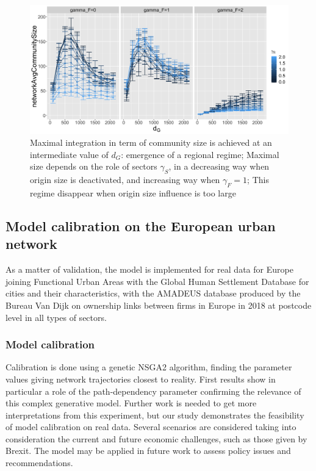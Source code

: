 \documentclass[11pt]{article}
\begin{document}
\begin{figure}
    \includegraphics[width=\textwidth]{figures/networkAvgCommunitySize_countryGravityDecay2100_gammaDestination0_facetwrapgammaOrigin_colorgammaSectors.png}
	\caption{Maximal integration in term of community size is achieved at an intermediate value of $d_G$: emergence of a regional regime; Maximal size depends on the role of sectors $\gamma_S$, in a decreasing way when origin size is deactivated, and increasing way when $\gamma_F=1$; This regime disappear when origin size influence is too large}
\end{figure}






\subsection{Model calibration on the European urban network}


As a matter of validation, the model is implemented for real data for Europe joining Functional Urban Areas with the Global Human Settlement Database for cities and their characteristics, with the AMADEUS database produced by the Bureau Van Dijk on ownership links between firms in Europe in 2018 at postcode level in all types of sectors.



\subsubsection{Model calibration}

Calibration is done using a genetic NSGA2 algorithm, finding the parameter values giving network trajectories closest to reality. First results show in particular a role of the path-dependency parameter confirming the relevance of this complex generative model. Further work is needed to get more interpretations from this experiment, but our study demonstrates the feasibility of model calibration on real data. Several scenarios are considered taking into consideration the current and future economic challenges, such as those given by Brexit. The model may be applied in future work to assess policy issues and recommendations.
\end{document}
